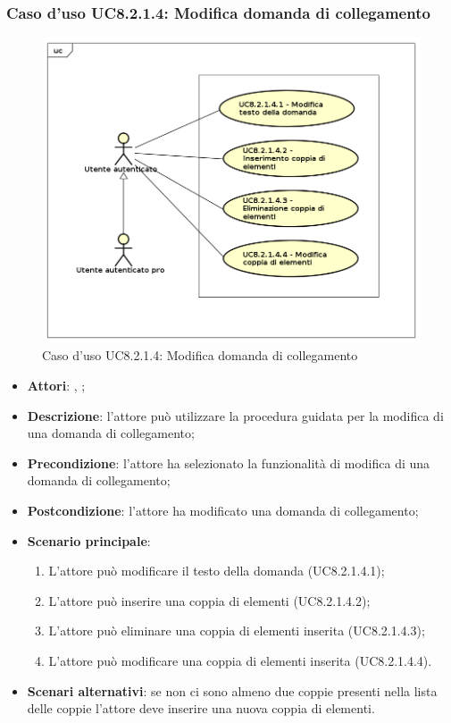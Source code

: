 \subsubsection{Caso d'uso UC8.2.1.4: Modifica domanda di collegamento}
\label{UC8.2.1.4}
\begin{figure}[h]
	\centering
	\includegraphics[scale=0.5,keepaspectratio]{UML/UC8_2_1_4.png}
	\caption{Caso d'uso UC8.2.1.4: Modifica domanda di collegamento}
\end{figure}
\FloatBarrier
\begin{itemize}
	\item \textbf{Attori}: \uau, \uaupro;
	\item \textbf{Descrizione}: l'attore può utilizzare la procedura guidata per la modifica di una domanda di collegamento; 
	\item \textbf{Precondizione}: l'attore ha selezionato la funzionalità di modifica di una domanda di collegamento; 
	\item \textbf{Postcondizione}: l'attore ha modificato una domanda di collegamento;
	\item \textbf{Scenario principale}: 
	\begin{enumerate}
			\item L'attore può modificare il testo della domanda (UC8.2.1.4.1);
			\item L'attore può inserire una coppia di elementi (UC8.2.1.4.2);
			\item L'attore può eliminare una coppia di elementi inserita (UC8.2.1.4.3);
			\item L'attore può modificare una coppia di elementi inserita (UC8.2.1.4.4).
		\end{enumerate}
	\item \textbf{Scenari alternativi}: se non ci sono almeno due coppie presenti nella lista delle coppie l'attore deve inserire una nuova coppia di elementi.
\end{itemize}

